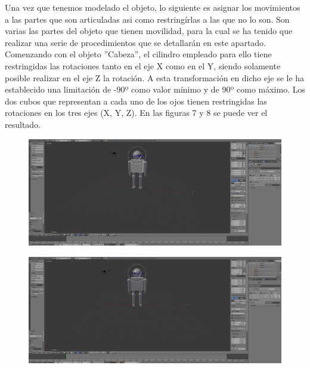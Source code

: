 \documentclass[10pt]{article}
\begin{document}
Una vez que tenemos modelado el objeto, lo siguiente es asignar los movimientos a las partes que son articuladas asi como restringírlas a las que no lo son. Son varias las partes del objeto que tienen movilidad, para la cual se ha tenido que realizar una serie de procedimientos que se detallarán en este apartado. \\

Comenzando con el objeto ''Cabeza'', el cilindro empleado para ello tiene restringidas las rotaciones tanto en el eje X como en el Y, siendo solamente posible realizar en el eje Z la rotación. A esta transformación en dicho eje se le ha establecido una limitación de -90º como valor mínimo y de 90º como máximo. Los dos cubos que representan a cada uno de los ojos tienen restringidas las rotaciones en los tres ejes (X, Y, Z). En las figuras 7 y 8 se puede ver el resultado.\\

\begin{figure}[H]
	\begin{center}
	 		\includegraphics[width = 1.00\textwidth]{Imagenes/p2-img6.png}
	\end{center} 
\end{figure}

\begin{figure}[H]
	\begin{center}
	 		\includegraphics[width = 1.00\textwidth]{Imagenes/p2-img7.png}
	\end{center} 
\end{figure}
\end{document}
